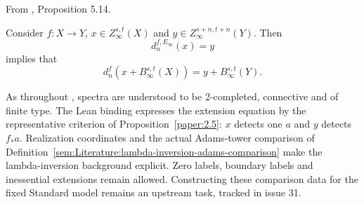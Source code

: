 \begin{proposition}
\label{paper:5.14}
From \cite{LWX126}, Proposition 5.14.\par
Consider $f: X\to Y$, $x\in Z_\infty^{s,t}(X)$ and $y\in Z_\infty^{s+n,t+n}(Y)$.
    Then
    $$d^{f,E_\infty}_n(x)=y$$
    implies that
    $$d^{f}_n(x+B_\infty^{s,t}(X))=y+B_\infty^{s,t}(Y).$$



As throughout \cite{LWX126}, spectra are understood to be 2-completed,
connective and of finite type. The Lean binding expresses the extension
equation by the representative criterion of Proposition~\ref{paper:2.5}:
$x$ detects one $a$ and $y$ detects $f_*a$. Realization coordinates and
the actual Adams-tower comparison of
Definition~\ref{sem:Literature:lambda-inversion-adams-comparison} make the
lambda-inversion background explicit. Zero labels, boundary labels and
inessential extensions remain allowed. Constructing these comparison
data for the fixed Standard model remains an upstream task, tracked in
issue 31.
\end{proposition}
